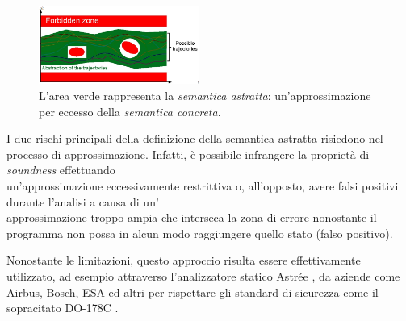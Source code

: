 \begin{figure}[ht]
    \centering
    \includegraphics[width=0.47\textwidth]{figures/semantica_astratta.png}
    \caption{L'area verde rappresenta la \textit{semantica astratta}: un'approssimazione per eccesso della \textit{semantica concreta}.}
    \label{fig:semantica_astratta}
\end{figure}

I due rischi principali della definizione della semantica astratta risiedono nel processo di approssimazione.
Infatti, è possibile infrangere la proprietà di \textit{soundness} effettuando \\un'approssimazione eccessivamente restrittiva o, all'opposto, avere falsi positivi durante l'analisi a causa di un'\\approssimazione troppo ampia che interseca la zona di errore nonostante il programma non possa in alcun modo raggiungere quello stato (falso positivo).

Nonostante le limitazioni, questo approccio risulta essere effettivamente utilizzato, ad esempio  attraverso l'analizzatore statico Astrée \cite{AbsIntProfile}, da aziende come Airbus, Bosch, ESA ed altri per rispettare gli standard di sicurezza come il sopracitato DO-178C \cite{AbsIntSuccess}.